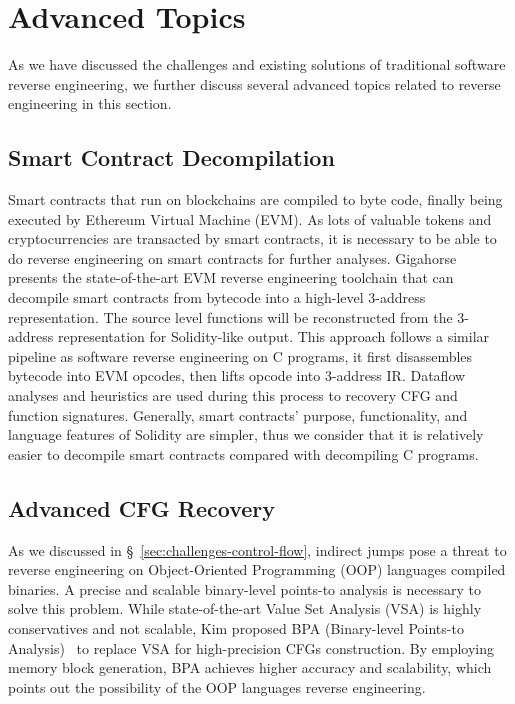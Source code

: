 \chapter{Advanced Topics}\label{sec-advanced}
As we have discussed the challenges and existing solutions of traditional 
software reverse engineering, we further discuss several advanced topics 
related to reverse engineering in this section.

\section{Smart Contract Decompilation}\label{sec:advanced-contract}
Smart contracts that run on blockchains are compiled to byte code, finally 
being executed by Ethereum Virtual Machine (EVM). As lots of valuable tokens 
and cryptocurrencies are transacted by smart contracts, it is necessary to be 
able to do reverse engineering on smart contracts for further analyses. 
Gigahorse~\cite{grech2019gigahorse} presents the state-of-the-art EVM reverse 
engineering toolchain that can decompile smart contracts from bytecode into a 
high-level 3-address representation. The source level functions will be 
reconstructed from the 3-address representation for Solidity-like output. This 
approach follows a similar pipeline as software reverse engineering on C 
programs, it first disassembles bytecode into EVM opcodes, then lifts opcode 
into 3-address IR. Dataflow analyses and heuristics are used during this 
process to recovery CFG and function signatures.  Generally, smart contracts' 
purpose, functionality, and language features of Solidity are simpler, thus we 
consider that it is relatively easier to decompile smart contracts compared 
with decompiling C programs.


\section{Advanced CFG Recovery}\label{sec:advanced-cfg}
As we discussed in \S~\ref{sec:challenges-control-flow}, indirect jumps pose a 
threat to reverse engineering on Object-Oriented Programming (OOP) languages 
compiled binaries. A precise and scalable binary-level points-to analysis is 
necessary to solve this problem. While state-of-the-art Value Set Analysis 
(VSA) is highly conservatives and not scalable, Kim \etal proposed BPA 
(Binary-level Points-to Analysis)~\cite{kim2021refining} to replace VSA for 
high-precision CFGs construction. By employing memory block generation, BPA 
achieves higher accuracy and scalability, which points out the possibility of 
the OOP languages reverse engineering.


